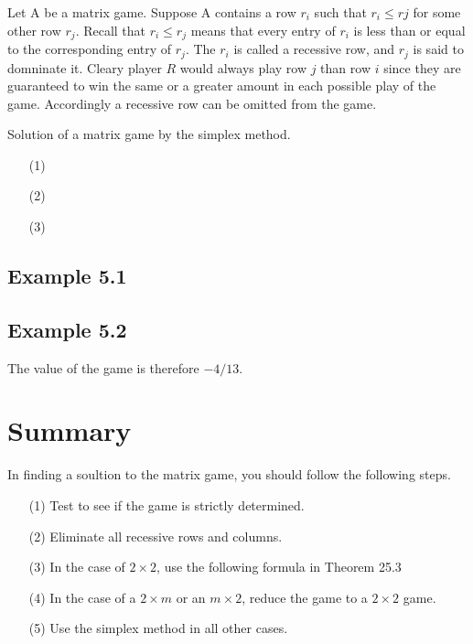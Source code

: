 {Let A be a matrix game. Suppose A contains a row $r_i$ such that $r_i \leq rj$ for some other
row $r_j$.
Recall that $r_i\leq r_j$ means that every entry of $r_i$ is less than or equal to the corresponding entry of $r_j$.
The $r_i$ is called a recessive row, and $r_j$ is said to domninate it.
Cleary player $R$ would always play row $j$ than row $i$ since they are guaranteed to win the same or a greater amount in each possible play of the game.
Accordingly a recessive row can be omitted from the game.

Solution of a matrix game by the simplex method.

\begin{itemize}
\item[(1)]
\item[(2)]
\item[(3)]
\end{itemize}

\subsection*{Example 5.1}

\subsection*{Example 5.2}


The value of the game is therefore $-4/13$.


\section{Summary}

In finding a soultion to the matrix game, you should follow the following steps.
\begin{itemize}
\item[(1)] Test to see if the game is strictly determined.
\item[(2)] Eliminate all recessive rows and columns.
\item[(3)] In the case of $2 \times 2$, use the following formula in Theorem 25.3
\item[(4)] In the case of a $2 \times m$ or an $m \times 2$, reduce the game to a $2 \times 2$ game.
\item[(5)] Use the simplex method in all other cases.
\end{itemize}



}
